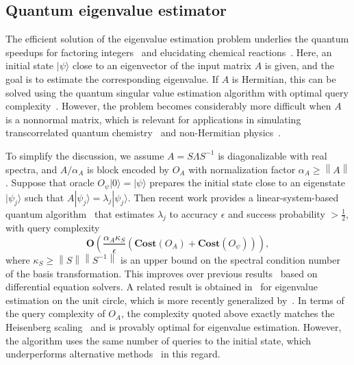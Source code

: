 \documentclass[letterpaper,onecolumn,11pt,accepted=2026-02-14]{quantumarticle}
\newcommand{\norm}[1]{\left\lVert#1\right\rVert}
\theoremstyle{remark}
\theoremstyle{plain}
\newcommand{\ket}[1]{|#1\rangle}
\begin{document}
\subsection{Quantum eigenvalue estimator}
\label{sec:precond_est}
The efficient solution of the eigenvalue estimation problem underlies the quantum speedups for factoring integers~\cite{sho_polynomialtime_1997} and elucidating chemical reactions~\cite{vonBurg21,Lee21}. Here, an initial state $\ket{\psi}$ close to an eigenvector of the input matrix $A$ is given, and the goal is to estimate the corresponding eigenvalue.
If $A$ is Hermitian, this can be solved using the quantum singular value estimation algorithm with optimal query complexity~\cite{kerenidis2016quantum,Chakraborty2018BlockEncoding,Gilyen2018singular}. However, the problem becomes considerably more difficult when $A$ is a nonnormal matrix, which is relevant for applications in simulating transcorrelated quantum chemistry~\cite{McArdle20} and non-Hermitian physics~\cite{Bender07,Ashida20}.

To simplify the discussion, we assume $A=S\Lambda S^{-1}$ is diagonalizable with real spectra, and $A/\alpha_A$ is block encoded by $O_A$ with normalization factor $\alpha_A\geq\norm{A}$.
Suppose that oracle $O_\psi\ket{0}=\ket{\psi}$ prepares the initial state close to an eigenstate $\ket{\psi_{j}}$ such that $A\ket{\psi_{j}}=\lambda_j\ket{\psi_{j}}$.
Then recent work provides a linear-system-based quantum algorithm~\cite[Theorem 3]{QEVP} that estimates $\lambda_j$ to accuracy $\epsilon$ and success probability $>\frac{1}{2}$, with query complexity
\begin{equation}
    \mathbf{O}\left(\frac{\alpha_A\kappa_S}{\epsilon}
    \left(\mathbf{Cost}\left(O_A\right)+\mathbf{Cost}\left(O_{\psi}\right)\right)\right),
\end{equation}
where $\kappa_S\geq\norm{S}\norm{S^{-1}}$ is an upper bound on the spectral condition number of the basis transformation.
This improves over previous results~\cite{Shao2019eigenvalues,Shao2020GeneralizedEigenvalue} based on differential equation solvers.
A related result is obtained in~\cite[Theorem 12]{QEVP} for eigenvalue estimation on the unit circle, which is more recently generalized by~\cite{AlaseKaruvade24}.
In terms of the query complexity of $O_A$, the complexity quoted above exactly matches the Heisenberg scaling~\cite{Giovannetti06,Zwierz10} and is provably optimal for eigenvalue estimation.
However, the algorithm uses the same number of queries to the initial state, which underperforms alternative methods~\cite{Zhang2024Nonnormal} in this regard.
\end{document}
